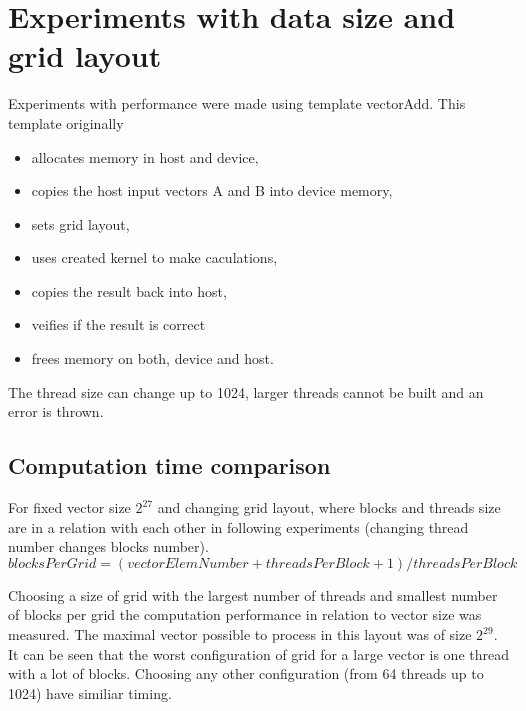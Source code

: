 \documentclass[12pt]{article}
\begin{document}
\section{Experiments with data size and grid layout}  \label{experients}
Experiments with performance were made using template vectorAdd. This template originally
\begin{itemize}
\item allocates memory in host and device,
\item copies the host input vectors A and B into device memory,
\item sets grid layout,
\item uses created kernel to make caculations,
\item copies the result back into host,
\item veifies if the result is correct
\item frees memory on both, device and host.
\end{itemize} 
The thread size can change up to 1024, larger threads cannot be built and an error is thrown.

\subsection{Computation time comparison}  \label{size_tests}

For fixed vector size $2^{27}$ and changing grid layout, where blocks and threads size are in a relation with each other in following experiments (changing thread number changes blocks number). 
\[ blocksPerGrid =  (vectorElemNumber + threadsPerBlock + 1) / threadsPerBlock \]


Choosing a size of grid with the largest number of threads and smallest number of blocks per grid the computation performance in relation to vector size was measured. The maximal vector possible to process in this layout was of size $2^{29}$. It can be seen that the worst configuration of grid for a large vector is one thread with a lot of blocks. Choosing any other configuration (from 64 threads up to 1024) have similiar timing.
\end{document}
